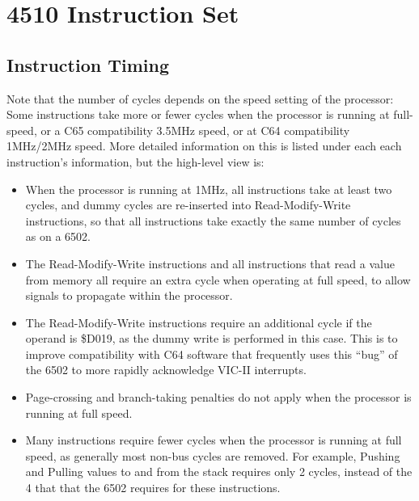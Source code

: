 



\section{4510 Instruction Set}

\subsection{Instruction Timing}

Note that the number of cycles depends on the speed setting of the
processor: Some instructions take more or fewer cycles when the
processor is running at full-speed, or a C65 compatibility 3.5MHz speed,
or at C64 compatibility 1MHz/2MHz speed.  More detailed information on
this is listed under each each instruction's information, but the high-level
view is:

\begin{itemize}
\item When the processor is running at 1MHz, all instructions take at least
  two cycles, and dummy cycles are re-inserted into Read-Modify-Write instructions,
  so that all instructions take exactly the same number of cycles as on a 6502.
\item The Read-Modify-Write instructions and all instructions that read a value from
  memory all require an extra cycle when operating at full speed, to allow signals
  to propagate within the processor.
\item The Read-Modify-Write instructions require an additional cycle if the operand
  is \$D019, as the dummy write is performed in this case.
  This is to improve compatibility with C64 software that frequently uses this
  ``bug'' of the 6502 to more rapidly acknowledge VIC-II interrupts.
\item Page-crossing and branch-taking penalties do not apply when the processor is
  running at full speed.
\item Many instructions require fewer cycles when the processor is running at full
  speed, as generally most non-bus cycles are removed. For example, Pushing and Pulling
  values to and from the stack requires only 2 cycles, instead of the 4 that that the
  6502 requires for these instructions.
\end{itemize}

